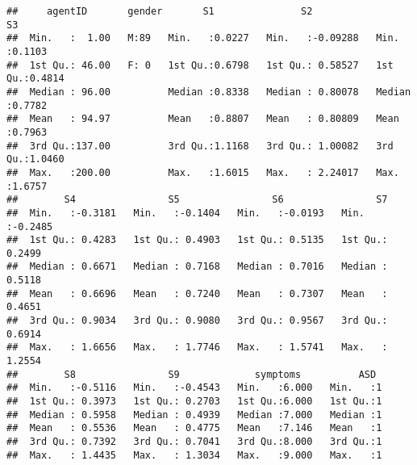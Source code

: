 \documentclass[]{article}
\newenvironment{Shaded}{\begin{snugshade}}{\end{snugshade}}
\newcommand{\KeywordTok}[1]{\textcolor[rgb]{0.13,0.29,0.53}{\textbf{#1}}}
\newcommand{\DecValTok}[1]{\textcolor[rgb]{0.00,0.00,0.81}{#1}}
\newcommand{\StringTok}[1]{\textcolor[rgb]{0.31,0.60,0.02}{#1}}
\newcommand{\CommentTok}[1]{\textcolor[rgb]{0.56,0.35,0.01}{\textit{#1}}}
\newcommand{\OperatorTok}[1]{\textcolor[rgb]{0.81,0.36,0.00}{\textbf{#1}}}
\newcommand{\NormalTok}[1]{#1}
\begin{document}
\begin{verbatim}
##     agentID       gender       S1               S2                 S3        
##  Min.   :  1.00   M:89   Min.   :0.0227   Min.   :-0.09288   Min.   :0.1103  
##  1st Qu.: 46.00   F: 0   1st Qu.:0.6798   1st Qu.: 0.58527   1st Qu.:0.4814  
##  Median : 96.00          Median :0.8338   Median : 0.80078   Median :0.7782  
##  Mean   : 94.97          Mean   :0.8807   Mean   : 0.80809   Mean   :0.7963  
##  3rd Qu.:137.00          3rd Qu.:1.1168   3rd Qu.: 1.00082   3rd Qu.:1.0460  
##  Max.   :200.00          Max.   :1.6015   Max.   : 2.24017   Max.   :1.6757  
##        S4                S5                S6                S7         
##  Min.   :-0.3181   Min.   :-0.1404   Min.   :-0.0193   Min.   :-0.2485  
##  1st Qu.: 0.4283   1st Qu.: 0.4903   1st Qu.: 0.5135   1st Qu.: 0.2499  
##  Median : 0.6671   Median : 0.7168   Median : 0.7016   Median : 0.5118  
##  Mean   : 0.6696   Mean   : 0.7240   Mean   : 0.7307   Mean   : 0.4651  
##  3rd Qu.: 0.9034   3rd Qu.: 0.9080   3rd Qu.: 0.9567   3rd Qu.: 0.6914  
##  Max.   : 1.6656   Max.   : 1.7746   Max.   : 1.5741   Max.   : 1.2554  
##        S8                S9             symptoms          ASD   
##  Min.   :-0.5116   Min.   :-0.4543   Min.   :6.000   Min.   :1  
##  1st Qu.: 0.3973   1st Qu.: 0.2703   1st Qu.:6.000   1st Qu.:1  
##  Median : 0.5958   Median : 0.4939   Median :7.000   Median :1  
##  Mean   : 0.5536   Mean   : 0.4775   Mean   :7.146   Mean   :1  
##  3rd Qu.: 0.7392   3rd Qu.: 0.7041   3rd Qu.:8.000   3rd Qu.:1  
##  Max.   : 1.4435   Max.   : 1.3034   Max.   :9.000   Max.   :1
\end{verbatim}

\begin{Shaded}
\end{Shaded}
\end{document}
